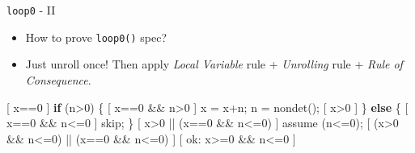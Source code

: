 \documentclass[
  10pt,
  ignorenonframetext,
]{beamer}
\newenvironment{Shaded}{\begin{snugshade}}{\end{snugshade}}
\newcommand{\ControlFlowTok}[1]{\textcolor[rgb]{0.99,0.74,0.29}{\textbf{#1}}}
\newcommand{\DecValTok}[1]{\textcolor[rgb]{0.96,0.45,0.00}{#1}}
\newcommand{\NormalTok}[1]{\textcolor[rgb]{0.81,0.81,0.76}{#1}}
\newcommand{\OperatorTok}[1]{\textcolor[rgb]{0.81,0.81,0.76}{#1}}
\providecommand{\tightlist}{%
  \setlength{\itemsep}{0pt}\setlength{\parskip}{0pt}}
\begin{document}
\begin{frame}[fragile]{\texttt{loop0} - II}
\label{loop0---ii}
\begin{itemize}
\tightlist
\item
  How to prove \texttt{loop0()} spec?
\end{itemize}

\pause

\begin{itemize}
\tightlist
\item
  Just unroll once! Then apply \emph{Local Variable} rule +
  \emph{Unrolling} rule + \emph{Rule of Consequence}.
\end{itemize}

\begin{Shaded}
\begin{Highlighting}[]
\OperatorTok{[}\NormalTok{ x}\OperatorTok{==}\DecValTok{0} \OperatorTok{]}
    \ControlFlowTok{if} \OperatorTok{(}\NormalTok{n}\OperatorTok{\textgreater{}}\DecValTok{0}\OperatorTok{)} \OperatorTok{\{}
        \OperatorTok{[}\NormalTok{ x}\OperatorTok{==}\DecValTok{0} \OperatorTok{\&\&}\NormalTok{ n}\OperatorTok{\textgreater{}}\DecValTok{0} \OperatorTok{]}
\NormalTok{        x }\OperatorTok{=}\NormalTok{ x}\OperatorTok{+}\NormalTok{n}\OperatorTok{;}\NormalTok{ n }\OperatorTok{=}\NormalTok{ nondet}\OperatorTok{();} \OperatorTok{[}\NormalTok{ x}\OperatorTok{\textgreater{}}\DecValTok{0} \OperatorTok{]}
    \OperatorTok{\}} \ControlFlowTok{else}
    \OperatorTok{\{} \OperatorTok{[}\NormalTok{ x}\OperatorTok{==}\DecValTok{0} \OperatorTok{\&\&}\NormalTok{ n}\OperatorTok{\textless{}=}\DecValTok{0} \OperatorTok{]}\NormalTok{ skip}\OperatorTok{;}
    \OperatorTok{\}}
    \OperatorTok{[}\NormalTok{ x}\OperatorTok{\textgreater{}}\DecValTok{0} \OperatorTok{||} \OperatorTok{(}\NormalTok{x}\OperatorTok{==}\DecValTok{0} \OperatorTok{\&\&}\NormalTok{ n}\OperatorTok{\textless{}=}\DecValTok{0}\OperatorTok{)} \OperatorTok{]}
\NormalTok{        assume }\OperatorTok{(}\NormalTok{n}\OperatorTok{\textless{}=}\DecValTok{0}\OperatorTok{);}
    \OperatorTok{[} \OperatorTok{(}\NormalTok{x}\OperatorTok{\textgreater{}}\DecValTok{0} \OperatorTok{\&\&}\NormalTok{ n}\OperatorTok{\textless{}=}\DecValTok{0}\OperatorTok{)} \OperatorTok{||} \OperatorTok{(}\NormalTok{x}\OperatorTok{==}\DecValTok{0} \OperatorTok{\&\&}\NormalTok{ n}\OperatorTok{\textless{}=}\DecValTok{0}\OperatorTok{)} \OperatorTok{]}
\OperatorTok{[}\NormalTok{ ok}\OperatorTok{:}\NormalTok{ x}\OperatorTok{\textgreater{}=}\DecValTok{0} \OperatorTok{\&\&}\NormalTok{ n}\OperatorTok{\textless{}=}\DecValTok{0} \OperatorTok{]}
\end{Highlighting}
\end{Shaded}
\end{frame}
\end{document}
